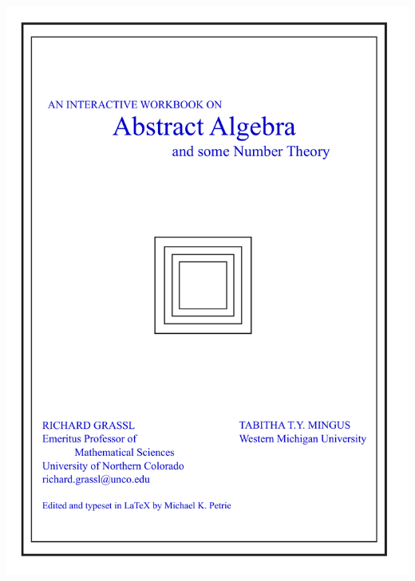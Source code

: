 \documentclass[12pt]{book}
\theoremstyle{definition}
\begin{document}
\centerline{\includegraphics[width=6in]{coverpage2.pdf}}

\cleardoublepage



\cleardoublepage
\end{document}
